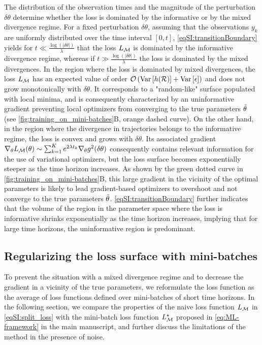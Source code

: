 The distribution of the observation times and the magnitude of the perturbation $\delta \theta$ determine whether the loss is dominated by the informative or by the mixed divergence regime. 
% 
For a fixed perturbation $\delta \theta$, assuming that the observations $y_{k}$ are uniformly distributed over the time interval $\left[0, t \right]$, \cref{eqSI:transitionBoundary} yields for $t \ll \frac{\log(|\delta\theta|)}{\lambda}$ that the loss $L_{\mathcal{M}}$ is dominated by the informative divergence regime, whereas if $t  \gg \frac{\log(|\delta\theta|)}{\lambda}$ the loss is dominated by the mixed divergences. 
% 
In the region where the loss is dominated by mixed divergences, the loss $L_{\mathcal{M}}$ has an expected value of order $\mathcal{O}\left({\operatorname{Var}}\left[h(\mathcal{R})\right] + {\operatorname{Var}}\left[\epsilon\right]\right)$ and does not grow monotonically with $\delta \theta$. It corresponds to a "random-like" surface populated with local minima, and is consequently characterized by an uninformative gradient preventing local optimizers from converging to the true parameters $\Tilde \theta$ (see \cref{fig:training_on_mini-batches}B, orange dashed curve).
% 
On the other hand, in the region where the divergence in trajectories belongs to the informative regime, the loss is convex and grows with $\delta \theta$. Its associated gradient $\nabla_\theta L_{\mathcal{M}}(\theta) \sim \sum_{k=1}^{K} e^{2\lambda t_k} \nabla_\theta g^2(\delta \theta)$ consequently contains relevant information for the use of variational optimizers, but the loss surface becomes exponentially steeper as the time horizon increases.
As shown by the green dotted curve in \cref{fig:training_on_mini-batches}B, this large gradient in the vicinity of the optimal parameters is likely to lead gradient-based optimizers to overshoot and not converge to the true parameters $\Tilde \theta$.
% 
\cref{eqSI:transitionBoundary} further indicates that the volume of the region in the parameter space where the loss is informative shrinks exponentially as the time horizon increases, implying that for large time horizons, the uninformative region is predominant.

\subsection{Regularizing the loss surface with mini-batches}
% 
To prevent the situation with a mixed divergence regime and to decrease the gradient in a vicinity of the true parameters, we reformulate the loss function as the average of loss functions defined over mini-batches of short time horizons. In the following section, we compare the properties of the naive loss function $L_{\mathcal{M}}$ in \cref{eqSI:split_loss} with the mini-batch loss function $L^\star_{\mathcal{M}}$ proposed in \cref{eq:ML-framework} in the main manuscript, and further discuss the limitations of the method in the presence of noise.

